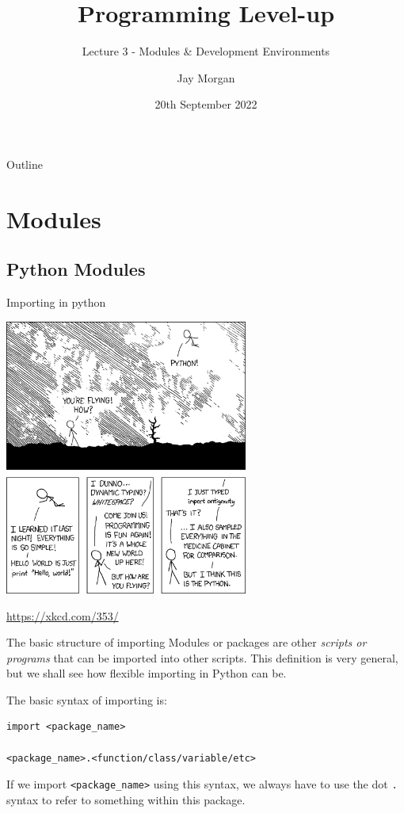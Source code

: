 \documentclass[10pt]{beamer}
\author{Jay Morgan}
\date{20th September 2022}
\title{Programming Level-up}
\subtitle{Lecture 3 - Modules \& Development Environments}
\begin{document}
\maketitle
\begin{frame}{Outline}
\tableofcontents
\end{frame}


\section{Modules}
\label{sec:org4a5025c}

\subsection{Python Modules}
\label{sec:org118f81a}

\begin{frame}[label={sec:org831d5e6}]{Importing in python}
\begin{center}
\includegraphics[width=0.6\textwidth]{images/python.png}
\end{center}
\url{https://xkcd.com/353/}
\end{frame}

\begin{frame}[label={sec:org38cc61d},fragile]{The basic structure of importing}
 Modules or packages are other \emph{scripts or programs} that can be imported into other
scripts. This definition is very general, but we shall see how flexible importing in
Python can be.

The basic syntax of importing is:

\begin{verbatim}
import <package_name>

<package_name>.<function/class/variable/etc>
\end{verbatim}

If we import \texttt{<package\_name>} using this syntax, we always have to use the dot \texttt{.} syntax
to refer to something within this package.
\end{frame}
\end{document}
